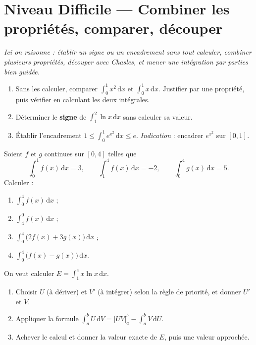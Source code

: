 \documentclass[11pt,a4paper]{article}
\newcommand{\dd}{\mathrm{d}}
\begin{document}
\section*{Niveau Difficile — Combiner les propriétés, comparer, découper}

\begin{center}
\itshape\small Ici on raisonne : établir un signe ou un encadrement \emph{sans tout calculer},
combiner plusieurs propriétés, découper avec Chasles, et mener une intégration par parties bien
guidée.
\end{center}

\medskip

\begin{exo}
\begin{enumerate}[label=\alph*),leftmargin=1.8em]
  \item Sans les calculer, comparer $\displaystyle\int_0^1 x^2\,\dd x$ et $\displaystyle\int_0^1 x\,\dd x$.
        Justifier par une propriété, puis vérifier en calculant les deux intégrales.
  \item Déterminer le \textbf{signe} de $\displaystyle\int_1^2 \ln x\,\dd x$ sans calculer sa valeur.
  \item Établir l'encadrement $\displaystyle 1\leqslant\int_0^1 e^{x^2}\,\dd x\leqslant e$.
        \emph{Indication} : encadrer $e^{x^2}$ sur $[0,1]$.
\end{enumerate}
\end{exo}

\begin{exo}
Soient $f$ et $g$ continues sur $[0,4]$ telles que
\[
\int_0^1 f(x)\,\dd x=3,\qquad \int_1^4 f(x)\,\dd x=-2,\qquad \int_0^4 g(x)\,\dd x=5.
\]
Calculer :
\begin{enumerate}[label=\alph*),leftmargin=1.8em]
  \item $\displaystyle\int_0^4 f(x)\,\dd x$ ;
  \item $\displaystyle\int_4^0 f(x)\,\dd x$ ;
  \item $\displaystyle\int_0^4\bigl(2f(x)+3g(x)\bigr)\,\dd x$ ;
  \item $\displaystyle\int_0^4\bigl(f(x)-g(x)\bigr)\,\dd x$.
\end{enumerate}
\end{exo}

\begin{exo}
On veut calculer $\displaystyle E=\int_1^{e} x\ln x\,\dd x$.
\begin{enumerate}[label=\alph*),leftmargin=1.8em]
  \item Choisir $U$ (à dériver) et $V'$ (à intégrer) selon la règle de priorité, et donner $U'$ et $V$.
  \item Appliquer la formule $\displaystyle\int_a^b U\,\dd V=\bigl[UV\bigr]_a^b-\int_a^b V\,\dd U$.
  \item Achever le calcul et donner la valeur exacte de $E$, puis une valeur approchée.
\end{enumerate}
\end{exo}
\end{document}
